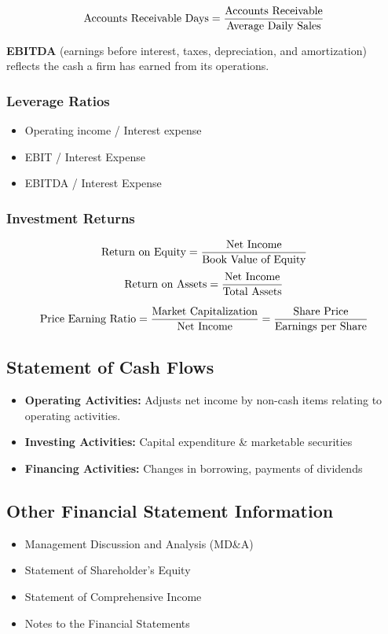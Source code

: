 \documentclass[english, 12pt]{article}
\begin{document}
\begin{rto}
\[\text{Accounts Receivable Days} = \frac{\text{Accounts Receivable}}{\text{Average Daily Sales}}\]
\end{rto}

\begin{defn}
\textbf{EBITDA} (earnings before interest, taxes, depreciation, and amortization) reflects the cash a firm has earned from its operations.
\end{defn}

\subsubsection*{Leverage Ratios}
\begin{itemize}
\item Operating income / Interest expense
\item EBIT / Interest Expense
\item EBITDA / Interest Expense
\end{itemize}

\subsubsection*{Investment Returns}
\[\text{Return on Equity} = \frac{\text{Net Income}}{\text{Book Value of Equity}}\]
\[\text{Return on Assets} = \frac{\text{Net Income}}{\text{Total Assets}}\]

\begin{rto}
\[ \text{Price Earning Ratio} = \frac{\text{Market Capitalization}}{\text{Net Income}} = \frac{\text{Share Price}}{\text{Earnings per Share}}\]
\end{rto}

\subsection{Statement of Cash Flows}
\begin{itemize}
\item \textbf{Operating Activities:} Adjusts net income by non-cash items relating to operating activities.
\item \textbf{Investing Activities:} Capital expenditure \& marketable securities
\item \textbf{Financing Activities:} Changes in borrowing, payments of dividends
\end{itemize}

\subsection{Other Financial Statement Information}
\begin{itemize}
\item Management Discussion and Analysis (MD\&A)
\item Statement of Shareholder's Equity
\item Statement of Comprehensive Income
\item Notes to the Financial Statements
\end{itemize}
\end{document}
